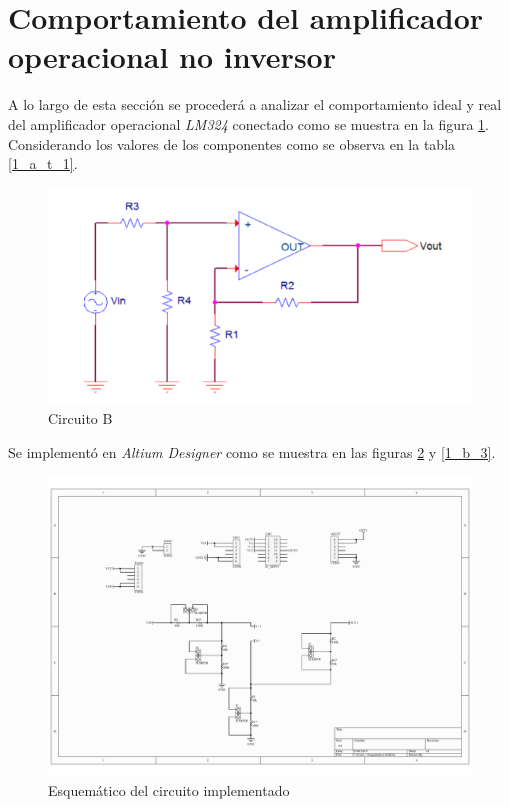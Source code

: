 \section{Comportamiento del amplificador operacional no inversor}

A lo largo de esta sección se procederá a analizar el comportamiento
ideal y real del amplificador operacional \emph{LM324 }conectado como
se muestra en la figura \ref{1_b_1}. Considerando los valores de
los componentes como se observa en la tabla \ref{1_a_t_1}. 

\begin{figure}[H]
\begin{centering}
\includegraphics[scale=0.5]{../Ex1/iB/Resources1b/circuit}
\par\end{centering}
\caption{Circuito B}
\label{1_b_1}

\end{figure}

Se implementó en \emph{Altium Designer }como se muestra en las figuras
\ref{1_b_2} y \ref{1_b_3}.

\begin{figure}[H]
\begin{centering}
\includegraphics[scale=0.5]{../Ex1/iB/Resources1b/Schematic}
\par\end{centering}
\caption{Esquemático del circuito implementado}
\label{1_b_2}

\end{figure}

